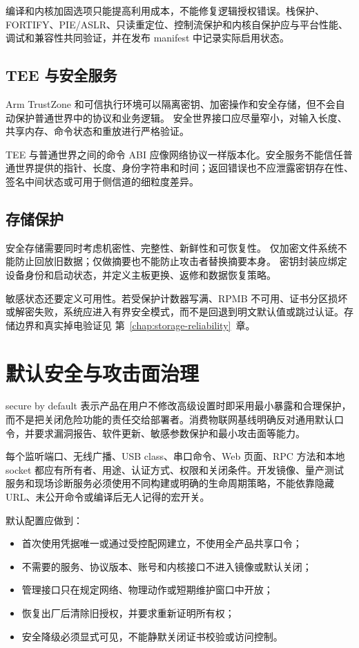 编译和内核加固选项只能提高利用成本，不能修复逻辑授权错误。栈保护、FORTIFY、PIE/ASLR、只读重定位、控制流保护和内核自保护应与平台性能、调试和兼容性共同验证，并在发布 manifest 中记录实际启用状态。

\subsection{TEE 与安全服务}

Arm TrustZone 和可信执行环境可以隔离密钥、加密操作和安全存储，但不会自动保护普通世界中的协议和业务逻辑。
安全世界接口应尽量窄小，对输入长度、共享内存、命令状态和重放进行严格验证。

TEE 与普通世界之间的命令 ABI 应像网络协议一样版本化。安全服务不能信任普通世界提供的指针、长度、身份字符串和时间；返回错误也不应泄露密钥存在性、签名中间状态或可用于侧信道的细粒度差异。

\subsection{存储保护}

安全存储需要同时考虑机密性、完整性、新鲜性和可恢复性。
仅加密文件系统不能防止回放旧数据；仅做摘要也不能防止攻击者替换摘要本身。
密钥封装应绑定设备身份和启动状态，并定义主板更换、返修和数据恢复策略。

敏感状态还要定义可用性。若受保护计数器写满、RPMB 不可用、证书分区损坏或解密失败，系统应进入有界安全模式，而不是回退到明文默认值或跳过认证。存储边界和真实掉电验证见 \mbox{第~\ref{chap:storage-reliability}~章}。

\section{默认安全与攻击面治理}

secure by default 表示产品在用户不修改高级设置时即采用最小暴露和合理保护，而不是把关闭危险功能的责任交给部署者。消费物联网基线明确反对通用默认口令，并要求漏洞报告、软件更新、敏感参数保护和最小攻击面等能力\cite{etsi-en-303-645}。

每个监听端口、无线广播、USB class、串口命令、Web 页面、RPC 方法和本地 socket 都应有所有者、用途、认证方式、权限和关闭条件。开发镜像、量产测试服务和现场诊断服务必须使用不同构建或明确的生命周期策略，不能依靠隐藏 URL、未公开命令或编译后无人记得的宏开关。

默认配置应做到：

\begin{itemize}
  \item 首次使用凭据唯一或通过受控配网建立，不使用全产品共享口令；
  \item 不需要的服务、协议版本、账号和内核接口不进入镜像或默认关闭；
  \item 管理接口只在规定网络、物理动作或短期维护窗口中开放；
  \item 恢复出厂后清除旧授权，并要求重新证明所有权；
  \item 安全降级必须显式可见，不能静默关闭证书校验或访问控制。
\end{itemize}

